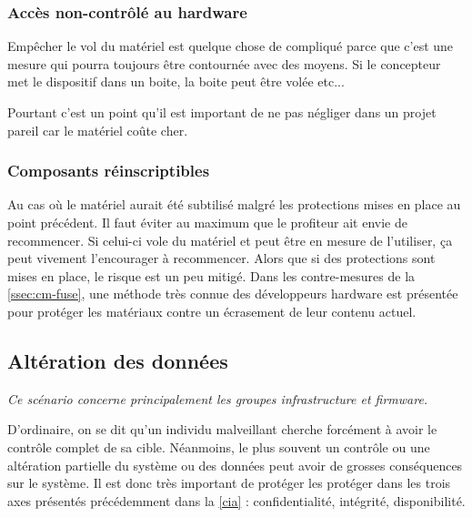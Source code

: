 \documentclass[12pt]{article}
\begin{document}
\subsubsection{Accès non-contrôlé au hardware}

Empêcher le vol du matériel est quelque chose de compliqué parce que c'est une mesure qui pourra toujours être contournée avec des moyens. Si le concepteur met le dispositif dans un boite, la boite peut être volée etc... 

Pourtant c'est un point qu'il est important de ne pas négliger dans un projet pareil car le matériel coûte cher.

\subsubsection{Composants réinscriptibles}

Au cas où le matériel aurait été subtilisé malgré les protections mises en place au point précédent. Il faut éviter au maximum que le profiteur ait envie de recommencer. Si celui-ci vole du matériel et peut être en mesure de l'utiliser, ça peut vivement l'encourager à recommencer. Alors que si des protections sont mises en place, le risque est un peu mitigé. Dans les contre-mesures de la \autoref{ssec:cm-fuse}, une méthode très connue des développeurs hardware est présentée pour protéger les matériaux contre un écrasement de leur contenu actuel.
\clearpage


\subsection{Altération des données}

\emph{Ce scénario concerne principalement les groupes infrastructure et firmware.}
\medskip

D'ordinaire, on se dit qu'un individu malveillant cherche forcément à avoir le contrôle complet de sa cible. Néanmoins, le plus souvent un contrôle ou une altération partielle du système ou des données peut avoir de grosses conséquences sur le système. Il est donc très important de protéger les protéger dans les trois axes présentés précédemment dans la \autoref{cia} : confidentialité, intégrité, disponibilité.
\medskip
\end{document}
